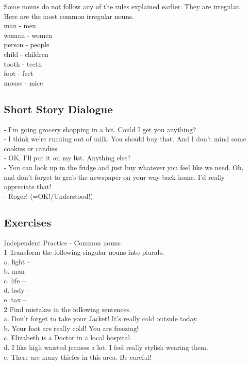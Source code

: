 \documentclass[12pt,a4paper]{article} %
\begin{document}
Some nouns do not follow any of the rules explained earlier. They are irregular. Here are the most common irregular nouns.\\

man - men\\
woman - women\\
person - people\\
child - children\\
tooth - teeth\\
foot - feet\\
mouse - mice\\

\subsection{Short Story Dialogue}

- I'm going grocery	shopping in a bit. Could I get you anything?\\
- I think we're running out of milk. You should buy that. And I don't mind some	cookies or candies.\\
- OK, I'll put it on my	list. Anything else?\\
- You can look up in the fridge	and just buy whatever you feel like we need. Oh, and don't forget to grab the newspaper	on your way back home. I'd really appreciate that!\\
- Roger! (=OK!/Understood!)\\

\subsection{Exercises}

Independent Practice - Common nouns\\
1 Transform the following singular nouns into plurals.\\
a. light –\\
b. man –\\
c. life – \\
d. lady –\\
e. tax – \\

2 Find mistakes in the following sentences.\\
a. Don't forget to take your Jacket! It's really cold outside today.\\
b. Your foot are really cold! You are freezing!\\
c. Elizabeth is a Doctor in a local hospital.\\
d. I like high waisted jeanses a lot. I feel really stylish wearing them.\\
e. There are many thiefes in this area. Be careful!\\
\end{document}
